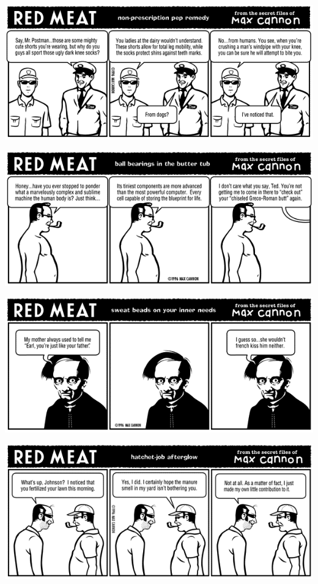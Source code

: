 \documentclass[a4paper,twoside,11pt]{article}
\begin{document}
\includegraphics[width=\textwidth]{redmeat_1996-10-28.png}



\includegraphics[width=\textwidth]{redmeat_1996-11-04.png}



\includegraphics[width=\textwidth]{redmeat_1996-11-11.png}



\includegraphics[width=\textwidth]{redmeat_1996-11-18.png}
\end{document}

